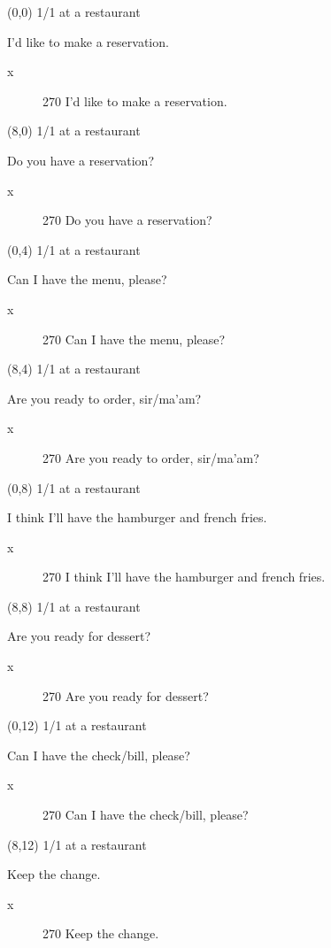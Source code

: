 \documentclass[a4paper]{article}
\newcommand{\mycard}[3]{%
	\small #1 #2
	\par
	\parbox[t][6.9cm][c]{9.5cm}{%
	\par
	\myleft{#3}
	\hspace*{4.6cm}
	x
	\myright{#3}
	}
}
\newcommand{\myleft}[1]{%
	\begin{sideways}
	\hspace*{-5.6cm}
		\parbox[t][2.5cm][c]{4.5cm}{%
		\Large #1
		}
	\end{sideways}
}
\newcommand{\myright}[1]{%
		\begin{figure}[b]
\begin{turn}{270} \Large #1 \end{turn}
		\end{figure}
}
\begin{document}
\begin{textblock}{8}(0,0)
\mycard{1/1}{at a restaurant}{
I'd like to make a reservation.
}
\end{textblock}

\begin{textblock}{8}(8,0)
\mycard{1/1}{at a restaurant}{
Do you have a reservation?
}
\end{textblock}

\begin{textblock}{8}(0,4)
\mycard{1/1}{at a restaurant}{
Can I have the menu, please?
}
\end{textblock}

\begin{textblock}{8}(8,4)
\mycard{1/1}{at a restaurant}{
Are you ready to order, sir/ma'am?
}
\end{textblock}

\begin{textblock}{8}(0,8)
\mycard{1/1}{at a restaurant}{
I think I'll have the hamburger and french fries.
}
\end{textblock}

\begin{textblock}{8}(8,8)
\mycard{1/1}{at a restaurant}{
Are you ready for dessert?
}
\end{textblock}

\begin{textblock}{8}(0,12)
\mycard{1/1}{at a restaurant}{
Can I have the check/bill, please?
}
\end{textblock}

\begin{textblock}{8}(8,12)
\mycard{1/1}{at a restaurant}{
Keep the change.
}
\end{textblock}

\null
\newpage
\end{document}
